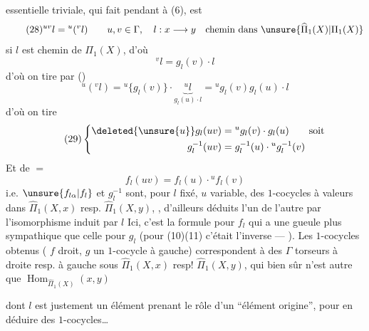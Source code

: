 essentielle triviale, qui fait pendant à (6), est
\[
\tag{28}{}^{uv}l={}^u({}^vl)
\qquad u,v\in\Gamma,\quad l:x\longrightarrow y\quad\text{chemin dans }\unsure{\widehat\Pi_1(X)|\Pi_1(X)}
\]
 si $l$ est chemin de $\Pi_1(X)$, d'où
\[
{}^vl=g_l(v)\cdot l
\]
 d'où on tire par ()
\[
{}^u({}^vl)={}^u\{g_l(v)\}\cdot\underbrace{{}^ul}_{g_l(u)\cdot l}
={}^ug_l(v)g_l(u)\cdot l
\]
d'où on tire
\[
\tag{29}\left\{\begin{aligned}
\deleted{\unsure{u}}g_l(uv)&={}^ug_l(v)\cdot g_l(u)\qquad\text{soit}\\
g_l^{-1}(uv)&=g_l^{-1}(u)\cdot{}^ug_l^{-1}(v)
\end{aligned}\right.
\]
Et de $=$
\[
\tag{30}f_l(uv)=f_l(u)\cdot{}^uf_l(v)
\]
i.e. $\unsure{f_{l\alpha}|f_l}$ et $g_l^{-1}$ sont, pour $l$ fixé, $u$ variable, des $1$-cocycles  à valeurs dans $\widehat\Pi_1(X,x)$ resp. $\widehat\Pi_1(X,y)$, , d'ailleurs déduits l'un de l'autre par l'isomorphisme
induit par $l$  Ici, c'est la formule pour $f_l$ qui a une gueule plus sympathique que celle pour $g_l$ (pour (10)(11) c'était l'inverse ---  ). Les $1$-cocycles obtenus ( $f$  droit, $g$ un $1$-cocycle à gauche) correspondent à des $\Gamma$ torseurs à droite resp. à gauche sous $\widehat\Pi_1(X,x)$ resp! $\widehat\Pi_1(X,y)$, qui bien sûr n'est autre que $\operatorname{Hom}_{\widehat\Pi_1(X)}(x,y)$


dont $l$ est justement un élément prenant le rôle d'un ``élément origine'', pour en déduire des $1$-cocycles\ldots

 

